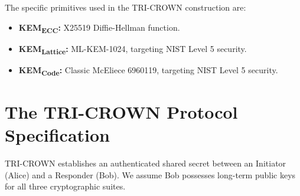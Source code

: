 \documentclass[11pt]{article}
\begin{document}
The specific primitives used in the TRI-CROWN construction are:
\begin{itemize}
    \item \textbf{KEM\textsubscript{ECC}:} X25519 Diffie-Hellman function.
    \item \textbf{KEM\textsubscript{Lattice}:} ML-KEM-1024, targeting NIST Level 5 security.
    \item \textbf{KEM\textsubscript{Code}:} Classic McEliece 6960119, targeting NIST Level 5 security.
\end{itemize}

\section{The TRI-CROWN Protocol Specification}
TRI-CROWN establishes an authenticated shared secret between an Initiator (Alice) and a Responder (Bob). We assume Bob possesses long-term public keys for all three cryptographic suites.
\end{document}
